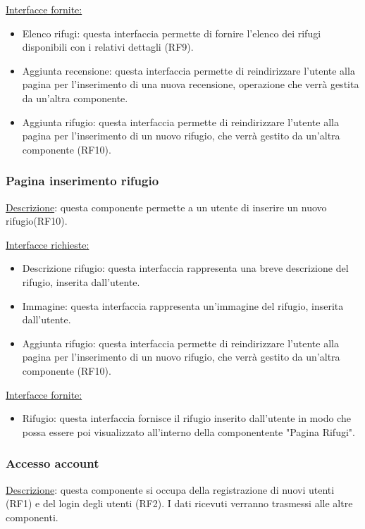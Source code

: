 \documentclass[a4paper,12pt]{article}
\begin{document}
\underline{Interfacce fornite:}
\begin{itemize}
\item Elenco rifugi: questa interfaccia permette di fornire l'elenco dei rifugi disponibili con i relativi dettagli (RF9).
\item Aggiunta recensione: questa interfaccia permette di reindirizzare l'utente alla pagina per l'inserimento di una nuova recensione, operazione che verrà gestita da un'altra componente.
\item Aggiunta rifugio: questa interfaccia permette di reindirizzare l'utente alla pagina per l'inserimento di un nuovo rifugio, che verrà gestito da un'altra componente (RF10).
\end{itemize}



\subsubsection{Pagina inserimento rifugio}
\underline{Descrizione}: questa componente permette a un utente di inserire un nuovo rifugio(RF10).

\underline{Interfacce richieste:}
\begin{itemize}
\item Descrizione rifugio: questa interfaccia rappresenta una breve descrizione del rifugio, inserita dall'utente.
\item Immagine: questa interfaccia rappresenta un'immagine del rifugio, inserita dall'utente.
\item Aggiunta rifugio: questa interfaccia permette di reindirizzare l'utente alla pagina per l'inserimento di un nuovo rifugio, che verrà gestito da un'altra componente (RF10).
\end{itemize}

\underline{Interfacce fornite:}
\begin{itemize}
\item Rifugio: questa interfaccia fornisce il rifugio inserito dall'utente in modo che possa essere poi visualizzato all'interno della componentente "Pagina Rifugi".
\end{itemize}



\subsubsection{Accesso account}
\underline{Descrizione}: questa componente si occupa della registrazione di nuovi utenti (RF1) e del login degli utenti (RF2). I dati ricevuti verranno trasmessi alle altre componenti.
\end{document}
